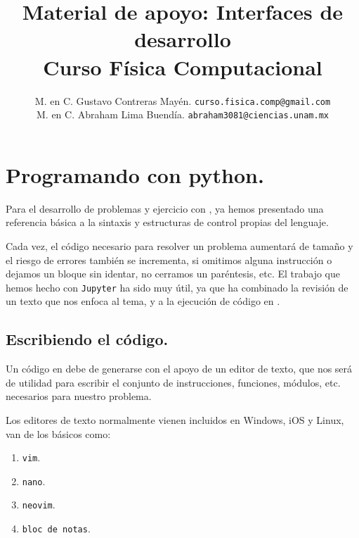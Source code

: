 
\hypersetup{
    colorlinks=true,
    linkcolor=blue,
    filecolor=magenta,      
    urlcolor=red,
    }


\author{M. en C. Gustavo Contreras Mayén. \texttt{curso.fisica.comp@gmail.com}\\
M. en C. Abraham Lima Buendía. \texttt{abraham3081@ciencias.unam.mx}}
\title{Material de apoyo: Interfaces de desarrollo \\ {\large Curso Física Computacional}}
\date{ }


\maketitle

\section{Programando con python.}

Para el desarrollo de problemas y ejercicio con \python, ya hemos presentado una referencia básica a la sintaxis y estructuras de control propias del lenguaje.
\par
Cada vez, el código necesario para resolver un problema aumentará de tamaño y el riesgo de errores también se incrementa, si omitimos alguna instrucción o dejamos un bloque sin identar, no cerramos un paréntesis, etc. El trabajo que hemos hecho con \texttt{Jupyter} ha sido muy útil, ya que ha combinado la revisión de un texto que nos enfoca al tema, y a la ejecución de código en \python.

\subsection{Escribiendo el código.}

Un código en \python debe de generarse con el apoyo de un editor de texto, que nos será de utilidad para escribir el conjunto de instrucciones, funciones, módulos, etc. necesarios para nuestro problema.
\par
Los editores de texto normalmente vienen incluidos en Windows, iOS y Linux, van de los básicos como:
\begin{enumerate}[label=\roman*)]
    \item \texttt{vim}.
    \item \texttt{nano}.
    \item \texttt{neovim}.
    \item \texttt{bloc de notas}.
\end{enumerate}


